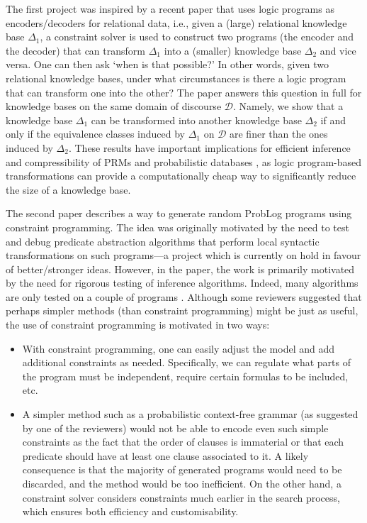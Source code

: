 \documentclass{article}
\begin{document}
The first project was inspired by a recent paper
\cite{DBLP:conf/ijcai/DumancicGMB19} that uses logic programs as
encoders/decoders for relational data, i.e., given a (large) relational
knowledge base $\Delta_1$, a constraint solver is used to construct two programs
(the encoder and the decoder) that can transform $\Delta_1$ into a (smaller)
knowledge base $\Delta_2$ and vice versa. One can then ask `when is that
possible?' In other words, given two relational knowledge bases, under what
circumstances is there a logic program that can transform one into the other?
The paper answers this question in full for knowledge bases on the same domain
of discourse $\mathcal{D}$. Namely, we show that a knowledge base $\Delta_1$ can
be transformed into another knowledge base $\Delta_2$ if and only if the
equivalence classes induced by $\Delta_1$ on $\mathcal{D}$ are finer than the
ones induced by $\Delta_2$. These results have important implications for
efficient inference and compressibility of PRMs and probabilistic databases
\cite{DBLP:journals/pvldb/SenDG08}, as logic program-based transformations can
provide a computationally cheap way to significantly reduce the size of a
knowledge base.

The second paper describes a way to generate random ProbLog programs using
constraint programming. The idea was originally motivated by the need to test
and debug predicate abstraction algorithms that perform local syntactic
transformations on such programs---a project which is currently on hold in
favour of better/stronger ideas. However, in the paper, the work is primarily
motivated by the need for rigorous testing of inference algorithms. Indeed, many
algorithms are only tested on a couple of programs
\cite{DBLP:conf/ecai/BruynoogheMKGVJR10,DBLP:journals/tplp/KimmigDRCR11,DBLP:conf/ijcai/VlasselaerBKMR15}.
Although some reviewers suggested that perhaps simpler methods (than constraint
programming) might be just as useful, the use of constraint programming is
motivated in two ways:
\begin{itemize}
\item With constraint programming, one can easily adjust the model and add
  additional constraints as needed. Specifically, we can regulate what parts of
  the program must be independent, require certain formulas to be included, etc.
\item A simpler method such as a probabilistic context-free grammar (as
  suggested by one of the reviewers) would not be able to encode even such
  simple constraints as the fact that the order of clauses is immaterial or that
  each predicate should have at least one clause associated to it. A likely
  consequence is that the majority of generated programs would need to be
  discarded, and the method would be too inefficient. On the other hand, a
  constraint solver considers constraints much earlier in the search process,
  which ensures both efficiency and customisability.
\end{itemize}
\end{document}
